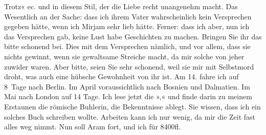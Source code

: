 \begin{ledgroupsized}[t]{13cm}
               Trotz« ec. und in diesem Stil, der die Liebe recht unangenehm macht. \pend
           \pstart
           Das Wesentlich an der Sache: dass ich ihrem Vater wahrscheinlich kein Versprechen gegeben hätte, wenn
               ich Mirjam sehr lieb hätte. Ferner: dass ich
               aber, nun ich das Versprechen gab, keine Lust habe Geschichten zu machen. Bringen Sie
               ihr das bitte schonend bei. Dies mit dem Versprechen nämlich, und vor allem, dass sie
               nichts gewinnt, wenn sie gewaltsame Streiche macht, da mir solche von jeher zuwider
               waren. Aber bitte, seien Sie sehr schonend, weil sie mir mit Selbstmord droht, was
               auch eine hübsche Gewohnheit von ihr ist. \pend
           \pstart
           Am 14. fahre ich auf 8 Tage nach Berlin. Im April voraussichtlich nach Bosnien und Dalmatien. Im
                  Mai nach London auf 14 Tage. \pend
           \pstart
           {\pb}Ich lese jetzt die »\label{K_L03339-34v}\label{K_L03339-34h},« und finde darin zu meinem Erstaunen die römische
               Buhlerin, die Bekenntnisse ablegt. Sie wissen, dass ich ein solches Buch schreiben
               wollte. Arbeiten kann ich nur wenig, da mir die Zeit fast alles weg nimmt. \pend
           \pstart
           Nun soll Aram fort, und ich für 8400fl.

\end{ledgroupsized}
